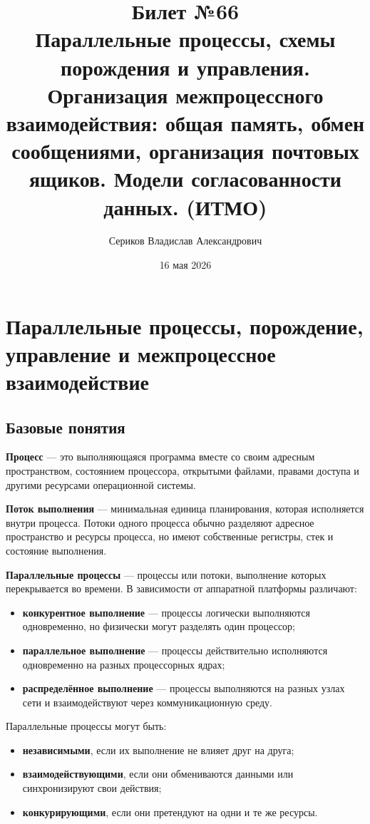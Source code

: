 \documentclass[12pt,a4paper]{article}
\title{Билет №66 \\ \small Параллельные процессы, схемы порождения и управления. Организация межпроцессного взаимодействия: общая память, обмен сообщениями, организация почтовых ящиков. Модели согласованности данных. (ИТМО)}
\author{Сериков Владислав Александрович}
\date{16 мая 2026}
\begin{document}
\maketitle
\tableofcontents
\newpage

\section{Параллельные процессы, порождение, управление и межпроцессное взаимодействие}

\subsection{Базовые понятия}

\textbf{Процесс} --- это выполняющаяся программа вместе со своим адресным пространством, состоянием процессора, открытыми файлами, правами доступа и другими ресурсами операционной системы.

\textbf{Поток выполнения} --- минимальная единица планирования, которая исполняется внутри процесса. Потоки одного процесса обычно разделяют адресное пространство и ресурсы процесса, но имеют собственные регистры, стек и состояние выполнения.

\textbf{Параллельные процессы} --- процессы или потоки, выполнение которых перекрывается во времени. В зависимости от аппаратной платформы различают:
\begin{itemize}
    \item \textbf{конкурентное выполнение} --- процессы логически выполняются одновременно, но физически могут разделять один процессор;
    \item \textbf{параллельное выполнение} --- процессы действительно исполняются одновременно на разных процессорных ядрах;
    \item \textbf{распределённое выполнение} --- процессы выполняются на разных узлах сети и взаимодействуют через коммуникационную среду.
\end{itemize}

Параллельные процессы могут быть:
\begin{itemize}
    \item \textbf{независимыми}, если их выполнение не влияет друг на друга;
    \item \textbf{взаимодействующими}, если они обмениваются данными или синхронизируют свои действия;
    \item \textbf{конкурирующими}, если они претендуют на одни и те же ресурсы.
\end{itemize}
\end{document}
